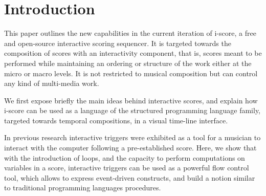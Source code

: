 \documentclass{article}
\title{\papertitle}
\begin{document}
%
\capstartfalse
\maketitle
\capstarttrue
%
\begin{abstract}
     The development and authoring of interactive music or applications, such as user interfaces for arts \& exhibitions
     has traditionally been done with tools that pertain to two broad metaphors. 
     Cue-based environments work by making groups of parameters and sending them to remote devices, 
     while more interactive applications are generally written in generic art-oriented 
     programming environments, such as Max/MSP, Processing or openFrameworks.
     In this paper, we present the current version of the i-score sequencer. 
     It is an extensive graphical software that bridges the gap between time-based, logic-based and flow-based interactive application authoring tools.
     Built upon a few simple and novel primitives that give to the composer the expressive power of structured programming, i-score provides a time line adapted to the notation of parameter-oriented interactive music, 
     and allows temporal scripting using JavaScript. We present the usage of these primitives, as well as an i-score example of work inspired from music based on polyvalent structure.
\end{abstract}
\section{Introduction}\label{sec:introduction}
This paper outlines the new capabilities in the current iteration of i-score, 
a free and open-source interactive scoring sequencer.
It is targeted towards the composition of scores with an interactivity component, that is, scores meant to be performed while maintaining an ordering or structure of the work either at the micro or macro levels.
It is not restricted to musical composition but can control any kind of multi-media work.

We first expose briefly the main ideas behind interactive scores, and explain 
how i-score can be used as a language of the structured programming language 
family, targeted towards temporal compositions, in a visual time-line interface.

In previous research\cite{allombert2006concurrent} interactive triggers 
were exhibited as a tool for a musician to interact with the computer following a pre-established score.
Here, we show that with the introduction of loops, and the capacity to perform computations 
on variables in a score, interactive triggers can be used as a powerful flow control tool, which 
allows to express event-driven constructs, and build a notion similar to traditional programming 
languages procedures.
\end{document}
